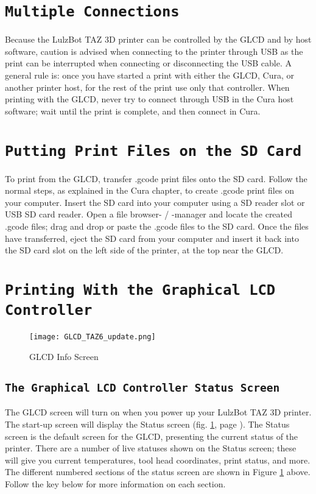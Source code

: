 \section{\texttt{Multiple Connections}}
Because the LulzBot TAZ 3D printer can be controlled by the GLCD and by host software, caution is advised when connecting to the printer through USB as the print can be interrupted when connecting or disconnecting the USB cable. A general rule is: once you have started a print with either the GLCD, Cura, or another printer host, for the rest of the print use only that controller. When printing with the GLCD, never try to connect through USB in the Cura host software; wait until the print is complete, and then connect in Cura.

\section{\texttt{Putting Print Files on the SD Card}}
To print from the GLCD, transfer .gcode print files onto the SD card. Follow the normal steps, as explained in the Cura chapter, to create .gcode print files on your computer. Insert the SD card into your computer using a SD reader slot or USB SD card reader. Open a file browser- / -manager and locate the created .gcode files; drag and drop or paste the .gcode files to the SD card. Once the files have transferred, eject the SD card from your computer and insert it back into the SD card slot on the left side of the printer, at the top near the GLCD.

\section{\texttt{Printing With the Graphical LCD Controller}}
\begin{figure}[b]
\centering
\texttt{[image: GLCD\_TAZ6\_update.png]}
\caption{GLCD Info Screen}
\label{fig:info_screen}
\end{figure}

\subsection{\texttt{The Graphical LCD Controller Status Screen}}
The GLCD screen will turn on when you power up your LulzBot TAZ 3D printer. The start-up screen will display the Status screen (fig. \ref{fig:info_screen}, page \pageref{fig:info_screen}). The Status screen is the default screen for the GLCD, presenting the current status of the printer. There are a number of live statuses shown on the Status screen; these will give you current temperatures, tool head coordinates, print status, and more. The different numbered sections of the status screen are shown in Figure \ref{fig:info_screen} above. Follow the key below for more information on each section.

